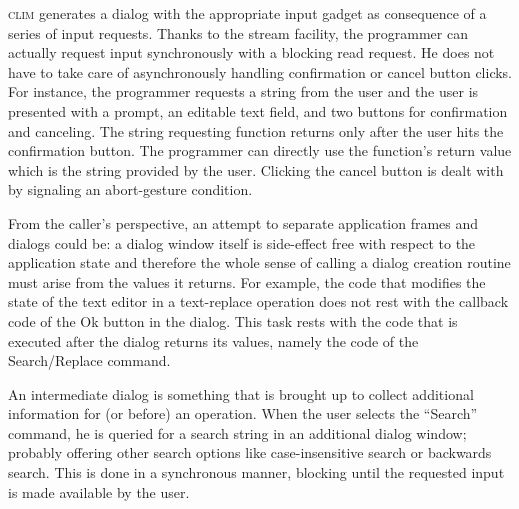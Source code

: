 \documentclass[twocolumn,a4paper]{article}
\newcommand {\code}[1]{{\sffamily #1}}
\newcommand {\CLIM}{\textsc{clim}}
\begin{document}
\CLIM{} generates a dialog with the appropriate input gadget as
consequence of a series of input requests. Thanks to the stream
facility, the programmer can actually request input synchronously with
a blocking read request. He does not have to take care of
asynchronously handling confirmation or cancel button clicks.  For
instance, the programmer requests a string from the user and the user
is presented with a prompt, an editable text field, and two buttons
for confirmation and canceling. 
The string requesting function returns only after the user hits the
confirmation button.  The
programmer can directly use the function's return value which is the
string provided by the user. 
Clicking the cancel button is dealt with by signaling an abort-gesture
condition.

From the caller's perspective, an attempt to separate application
frames and dialogs could be: a dialog window itself is side-effect
free with respect to the application state and therefore the whole
sense of calling a dialog creation routine must arise from the values
it returns. For example, the code that modifies the state of the text
editor in a text-replace operation does not rest with the callback
code of the Ok button in the dialog. This task rests with the code
that is executed after the dialog returns its values, namely the code
of the Search/Replace command.


An intermediate dialog is something that is brought up to collect
additional information for (or before) an operation. When the user
selects the ``Search'' command, he is queried for a search string in
an additional dialog window; probably offering other search options
like case-insensitive search or backwards search. This is done in a
synchronous manner, blocking until the requested input is made
available by the user.
\end{document}
